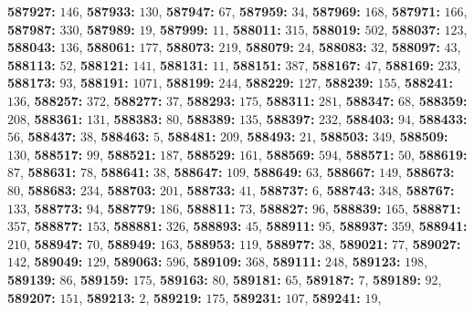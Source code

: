 \textsf{\bfseries 587927:} $146$, \textsf{\bfseries 587933:} $130$, \textsf{\bfseries 587947:} $67$, \textsf{\bfseries 587959:} $34$, \textsf{\bfseries 587969:} $168$, \textsf{\bfseries 587971:} $166$, \textsf{\bfseries 587987:} $330$, \textsf{\bfseries 587989:} $19$, \textsf{\bfseries 587999:} $11$, \textsf{\bfseries 588011:} $315$, \textsf{\bfseries 588019:} $502$, \textsf{\bfseries 588037:} $123$, \textsf{\bfseries 588043:} $136$, \textsf{\bfseries 588061:} $177$, \textsf{\bfseries 588073:} $219$, \textsf{\bfseries 588079:} $24$, \textsf{\bfseries 588083:} $32$, \textsf{\bfseries 588097:} $43$, \textsf{\bfseries 588113:} $52$, \textsf{\bfseries 588121:} $141$, \textsf{\bfseries 588131:} $11$, \textsf{\bfseries 588151:} $387$, \textsf{\bfseries 588167:} $47$, \textsf{\bfseries 588169:} $233$, \textsf{\bfseries 588173:} $93$, \textsf{\bfseries 588191:} $1071$, \textsf{\bfseries 588199:} $244$, \textsf{\bfseries 588229:} $127$, \textsf{\bfseries 588239:} $155$, \textsf{\bfseries 588241:} $136$, \textsf{\bfseries 588257:} $372$, \textsf{\bfseries 588277:} $37$, \textsf{\bfseries 588293:} $175$, \textsf{\bfseries 588311:} $281$, \textsf{\bfseries 588347:} $68$, \textsf{\bfseries 588359:} $208$, \textsf{\bfseries 588361:} $131$, \textsf{\bfseries 588383:} $80$, \textsf{\bfseries 588389:} $135$, \textsf{\bfseries 588397:} $232$, \textsf{\bfseries 588403:} $94$, \textsf{\bfseries 588433:} $56$, \textsf{\bfseries 588437:} $38$, \textsf{\bfseries 588463:} $5$, \textsf{\bfseries 588481:} $209$, \textsf{\bfseries 588493:} $21$, \textsf{\bfseries 588503:} $349$, \textsf{\bfseries 588509:} $130$, \textsf{\bfseries 588517:} $99$, \textsf{\bfseries 588521:} $187$, \textsf{\bfseries 588529:} $161$, \textsf{\bfseries 588569:} $594$, \textsf{\bfseries 588571:} $50$, \textsf{\bfseries 588619:} $87$, \textsf{\bfseries 588631:} $78$, \textsf{\bfseries 588641:} $38$, \textsf{\bfseries 588647:} $109$, \textsf{\bfseries 588649:} $63$, \textsf{\bfseries 588667:} $149$, \textsf{\bfseries 588673:} $80$, \textsf{\bfseries 588683:} $234$, \textsf{\bfseries 588703:} $201$, \textsf{\bfseries 588733:} $41$, \textsf{\bfseries 588737:} $6$, \textsf{\bfseries 588743:} $348$, \textsf{\bfseries 588767:} $133$, \textsf{\bfseries 588773:} $94$, \textsf{\bfseries 588779:} $186$, \textsf{\bfseries 588811:} $73$, \textsf{\bfseries 588827:} $96$, \textsf{\bfseries 588839:} $165$, \textsf{\bfseries 588871:} $357$, \textsf{\bfseries 588877:} $153$, \textsf{\bfseries 588881:} $326$, \textsf{\bfseries 588893:} $45$, \textsf{\bfseries 588911:} $95$, \textsf{\bfseries 588937:} $359$, \textsf{\bfseries 588941:} $210$, \textsf{\bfseries 588947:} $70$, \textsf{\bfseries 588949:} $163$, \textsf{\bfseries 588953:} $119$, \textsf{\bfseries 588977:} $38$, \textsf{\bfseries 589021:} $77$, \textsf{\bfseries 589027:} $142$, \textsf{\bfseries 589049:} $129$, \textsf{\bfseries 589063:} $596$, \textsf{\bfseries 589109:} $368$, \textsf{\bfseries 589111:} $248$, \textsf{\bfseries 589123:} $198$, \textsf{\bfseries 589139:} $86$, \textsf{\bfseries 589159:} $175$, \textsf{\bfseries 589163:} $80$, \textsf{\bfseries 589181:} $65$, \textsf{\bfseries 589187:} $7$, \textsf{\bfseries 589189:} $92$, \textsf{\bfseries 589207:} $151$, \textsf{\bfseries 589213:} $2$, \textsf{\bfseries 589219:} $175$, \textsf{\bfseries 589231:} $107$, \textsf{\bfseries 589241:} $19$, 

